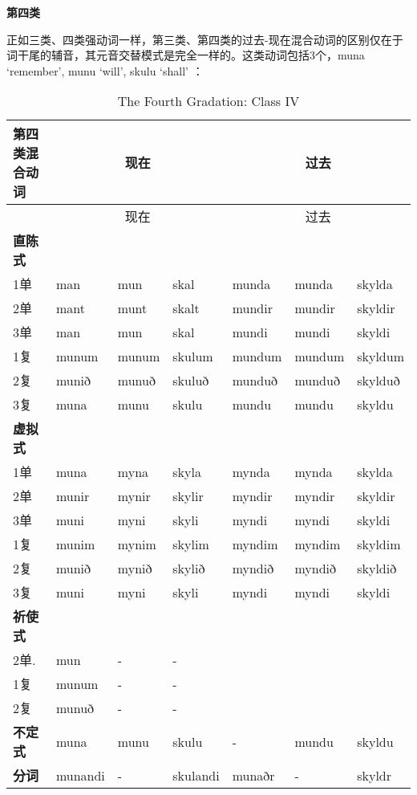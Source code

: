 \textbf{第四类}

正如三类、四类强动词一样，第三类、第四类的过去-现在混合动词的区别仅在于词干尾的辅音，其元音交替模式是完全一样的。这类动词包括3个，muna
`remember‌', munu `will‌', skulu `shall‌' ：

\begin{longtable}{lllllll}
\caption[The Fourth Gradation: Class IV]{The Fourth Gradation: Class
IV}\tabularnewline
\toprule
第四类混合动词 &\multicolumn{3}{c}{现在} &\multicolumn{3}{c}{过去} \\\midrule\endfirsthead{} &\multicolumn{3}{c}{现在} &\multicolumn{3}{c}{过去} \\
\midrule
\endhead
\bottomrule
\endfoot
\textbf{直陈式} & ~ & ~ & ~ & ~ & ~ & ~ \\
1单 & man & mun & skal & munda & munda & skylda \\
2单 & mant & munt & skalt & mundir & mundir & skyldir \\
3单 & man & mun & skal & mundi & mundi & skyldi \\
1复 & munum & munum & skulum & mundum & mundum & skyldum \\
2复 & munið & munuð & skuluð & munduð & munduð & skylduð \\
3复 & muna & munu & skulu & mundu & mundu & skyldu \\
\textbf{虚拟式} & ~ & ~ & ~ & ~ & ~ & ~ \\
1单 & muna & myna & skyla & mynda & mynda & skylda \\
2单 & munir & mynir & skylir & myndir & myndir & skyldir \\
3单 & muni & myni & skyli & myndi & myndi & skyldi \\
1复 & munim & mynim & skylim & myndim & myndim & skyldim \\
2复 & munið & mynið & skylið & myndið & myndið & skyldið \\
3复 & muni & myni & skyli & myndi & myndi & skyldi \\
\textbf{祈使式} & ~ & ~ & ~ & ~ & ~ & ~ \\
2单. & mun & - & - & ~ & ~ & ~ \\
1复 & munum & - & - & ~ & ~ & ~ \\
2复 & munuð & - & - & ~ & ~ & ~ \\
\textbf{不定式} & muna & munu & skulu & - & mundu & skyldu \\
\textbf{分词} & munandi & - & skulandi & munaðr & - & skyldr \\
\end{longtable}

